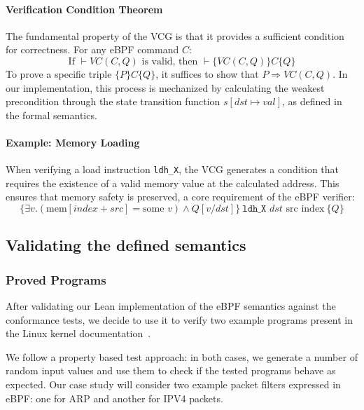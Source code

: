\documentclass[sigconf]{acmart}
\begin{document}
\paragraph{Verification Condition Theorem}
The fundamental property of the VCG is that it provides a sufficient condition for correctness. For any eBPF command $C$:
\[
\text{If } \vdash VC(C, Q) \text{ is valid, then } \vdash \{VC(C, Q)\} C \{Q\}
\]
To prove a specific triple $\{P\} C \{Q\}$, it suffices to show that $P \Rightarrow VC(C, Q)$. In our implementation, this process is mechanized by calculating the weakest precondition through the state transition function $s[dst \mapsto val]$, as defined in the formal semantics.

\paragraph{Example: Memory Loading}
When verifying a load instruction \texttt{ldh\_X}, the VCG generates a condition that requires the existence of a valid memory value at the calculated address. This ensures that memory safety is preserved, a core requirement of the eBPF verifier:
\[
\{ \exists v. (\text{mem}[index + src] = \text{some } v) \land Q[v/dst] \} \ \texttt{ldh\_X } dst \text{ src index} \ \{ Q \}
\]

\subsection{Validating the defined semantics} 



\subsubsection{Proved Programs}\label{sec:casestudy} %

After validating our Lean implementation of the eBPF semantics against 
the conformance tests, we decide to use it to verify two example programs
present in the Linux kernel documentation~\cite{linuxbpfc}. 

We follow a property based test approach: in both cases, we generate a number of random input values 
and use them to check if the tested programs behave as expected. Our case study will 
consider two example packet filters expressed in eBPF: one for ARP and another for IPV4 packets. 
\end{document}
